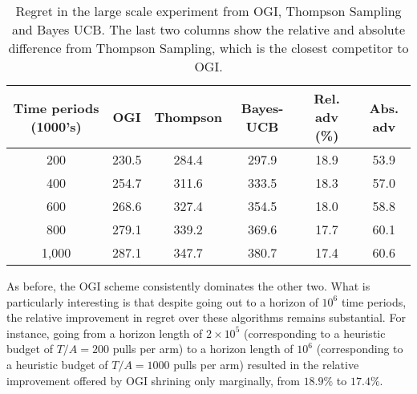 \begin{table}[h!]
	\centering
	\begin{tabular}{c|ccccc}
		\toprule
		Time periods (1000's) &   OGI &  Thompson &   Bayes-UCB &  Rel. adv (\%) &  Abs. adv \\
		\midrule
		200 & 230.5 &     284.4 & 297.9 &                      18.9 &                  53.9 \\
		400 & 254.7 &     311.6 & 333.5 &                      18.3 &                  57.0 \\
		600 & 268.6 &     327.4 & 354.5 &                      18.0 &                  58.8 \\
		800 & 279.1 &     339.2 & 369.6 &                      17.7 &                  60.1 \\
		1,000 & 287.1 &     347.7 & 380.7 &                      17.4 &                  60.6 \\
		\bottomrule
	\end{tabular}
	\caption{Regret in the large scale experiment from OGI, Thompson Sampling and Bayes UCB. The last two columns show the relative and absolute difference from Thompson Sampling, which is the closest competitor to OGI.}
	\label{table:additional_cli_table}
\end{table}

As before, the OGI scheme consistently dominates the other two. What is particularly interesting is that despite going out to a horizon of $10^6$ time periods, the relative improvement in regret over these algorithms remains substantial. For instance, going from a horizon length of $2 \times 10^5$ (corresponding to a heuristic budget of $T/A = 200$ pulls per arm) 
to a horizon length of $10^6$ (corresponding to a heuristic budget of $T/A = 1000$ pulls per arm) resulted in the relative improvement offered by OGI shrining only marginally, from $18.9\%$ to $17.4\%$. 




